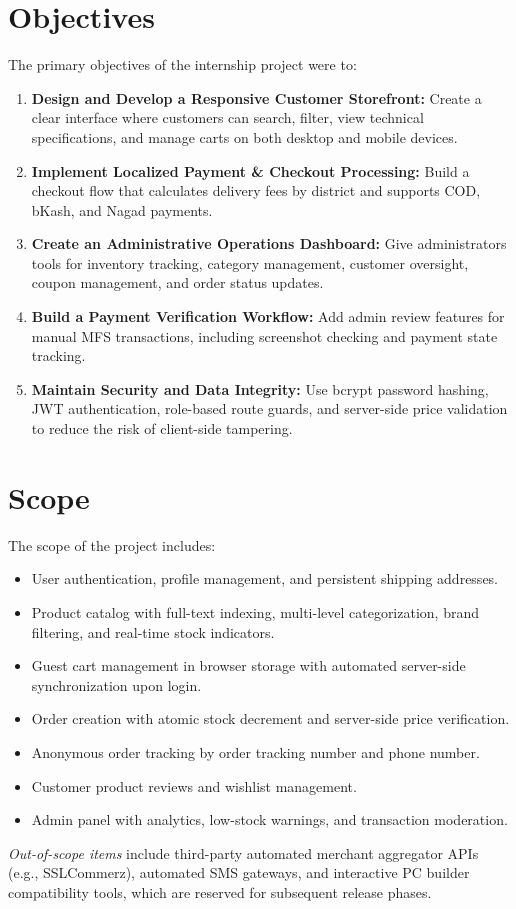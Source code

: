 \documentclass[12pt,a4paper,oneside]{report}
\begin{document}
\section{Objectives}
The primary objectives of the internship project were to:
\begin{enumerate}[label=\textbf{\arabic*.}]
    \item \textbf{Design and Develop a Responsive Customer Storefront:} Create a clear interface where customers can search, filter, view technical specifications, and manage carts on both desktop and mobile devices.
    \item \textbf{Implement Localized Payment \& Checkout Processing:} Build a checkout flow that calculates delivery fees by district and supports COD, bKash, and Nagad payments.
    \item \textbf{Create an Administrative Operations Dashboard:} Give administrators tools for inventory tracking, category management, customer oversight, coupon management, and order status updates.
    \item \textbf{Build a Payment Verification Workflow:} Add admin review features for manual MFS transactions, including screenshot checking and payment state tracking.
    \item \textbf{Maintain Security and Data Integrity:} Use bcrypt password hashing, JWT authentication, role-based route guards, and server-side price validation to reduce the risk of client-side tampering.
\end{enumerate}

\section{Scope}
The scope of the project includes:
\begin{itemize}
    \item User authentication, profile management, and persistent shipping addresses.
    \item Product catalog with full-text indexing, multi-level categorization, brand filtering, and real-time stock indicators.
    \item Guest cart management in browser storage with automated server-side synchronization upon login.
    \item Order creation with atomic stock decrement and server-side price verification.
    \item Anonymous order tracking by order tracking number and phone number.
    \item Customer product reviews and wishlist management.
    \item Admin panel with analytics, low-stock warnings, and transaction moderation.
\end{itemize}
\textit{Out-of-scope items} include third-party automated merchant aggregator APIs (e.g., SSLCommerz), automated SMS gateways, and interactive PC builder compatibility tools, which are reserved for subsequent release phases.
\end{document}
